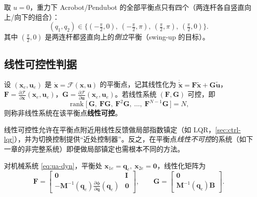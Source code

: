 \begin{example}\label{ex:ua-acro-eq}
取 $u=0$，重力下 Acrobot/Pendubot 的全部平衡点只有四个（两连杆各自竖直向上/向下的组合）：
\[
  (q_1,q_2)\in\Big\{(-\tfrac{\pi}{2},0),\ (-\tfrac{\pi}{2},\pi),\ (\tfrac{\pi}{2},\pi),\ (\tfrac{\pi}{2},0)\Big\}.
\]
其中 $(\tfrac{\pi}{2},0)$ 是两连杆都竖直向上的\emph{倒立}平衡（swing-up 的目标）。
\end{example}

\subsection{线性可控性判据}\label{sec:ua-lincontrol}

\begin{definition}[平衡点处的线性可控性]\label{def:ua-lincontrol}
设 $(\mathbf{x}_e,\mathbf{u}_e)$ 是 $\dot{\mathbf{x}}=\boldsymbol{\mathcal{F}}(\mathbf{x},\mathbf{u})$ 的平衡点，记其线性化为 $\dot{\tilde{\mathbf{x}}}=\mathbf{F}\tilde{\mathbf{x}}+\mathbf{G}\tilde{\mathbf{u}}$，$\mathbf{F}=\tfrac{\partial\boldsymbol{\mathcal{F}}}{\partial\mathbf{x}}(\mathbf{x}_e,\mathbf{u}_e)$，$\mathbf{G}=\tfrac{\partial\boldsymbol{\mathcal{F}}}{\partial\mathbf{u}}(\mathbf{x}_e,\mathbf{u}_e)$。若线性系统 $(\mathbf{F},\mathbf{G})$ 可控，即
\begin{equation}\label{eq:ua-kalman}
  \operatorname{rank}\big[\,\mathbf{G},\ \mathbf{F}\mathbf{G},\ \mathbf{F}^2\mathbf{G},\ \dots,\ \mathbf{F}^{N-1}\mathbf{G}\,\big]=N,
\end{equation}
则称非线性系统在该平衡点\textbf{线性可控}。
\end{definition}

线性可控性允许在平衡点附近用线性反馈做局部指数镇定（如 LQR，\cref{sec:ctrl-lqr}），并为切换控制提供“近处控制器”。反之，在平衡点\emph{线性不可控}的系统（如下一章的非完整系统）即便做局部镇定也需根本不同的方法。

对机械系统 \cref{eq:ua-dyn}，平衡处 $\mathbf{x}_{1e}=\mathbf{q}_e,\ \mathbf{x}_{2e}=\mathbf{0}$，线性化矩阵为
\begin{equation}\label{eq:ua-linFG}
  \mathbf{F}=\begin{bmatrix}\mathbf{0}&\mathbf{I}\\-\mathbf{M}^{-1}(\mathbf{q}_e)\tfrac{\partial\boldsymbol{\phi}}{\partial\mathbf{q}}(\mathbf{q}_e)&\mathbf{0}\end{bmatrix},\qquad
  \mathbf{G}=\begin{bmatrix}\mathbf{0}\\\mathbf{M}^{-1}(\mathbf{q}_e)\mathbf{B}\end{bmatrix}.
\end{equation}

